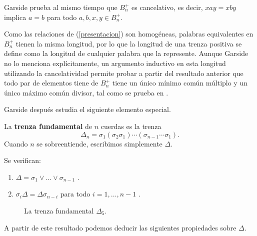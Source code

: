 \documentclass[bibtex, anon]{TEMat-article}
\begin{document}
Garside prueba al mismo tiempo que $B_n^+$ es cancelativo, es decir, $xay=xby$ implica $a=b$ para todo $a,b,x,y\in B_n^+$.

Como las relaciones de (\ref{presentacion}) son homogéneas, palabras equivalentes en $B_n^+$ tienen la misma longitud, por lo que la longitud de una trenza positiva se define como la longitud de cualquier palabra que la represente. Aunque Garside no lo menciona explícitamente, un argumento inductivo en esta longitud utilizando la cancelatividad permite probar a partir del resultado anterior que todo par de elementos tiene de $B_n^+$ tiene un único mínimo común múltiplo y un único máximo común divisor, tal como se prueba en \cite{Dehornoy}. 


Garside después estudia el siguiente elemento especial.
\begin{definicion}
	La \textbf{trenza fundamental} de $n$ cuerdas es la trenza
	$$\Delta_n=\sigma_1(\sigma_2\sigma_1)\cdots(\sigma_{n-1}\cdots\sigma_1).$$
	Cuando $n$ se sobreentiende, escribimos simplemente $\Delta$. 
\end{definicion} 


\begin{proposicion}\label{conjuga}
	Se verifican: 
	\begin{enumerate}
		\item $\Delta=\sigma_1\lor\dots\lor\sigma_{n-1}$ \cite[Lema 1]{Garside}.
		\item $\sigma_i\Delta=\Delta\sigma_{n-i}$ para todo $i=1,\dots, n-1$ \cite[Lema 4]{Garside}.
	\end{enumerate}
\end{proposicion} 


\begin{figure}[h!]
	\centering
	\caption{La trenza fundamental $\Delta_5$.}
\end{figure}


A partir de este resultado podemos deducir las siguientes propiedades sobre $\Delta$.
\end{document}
